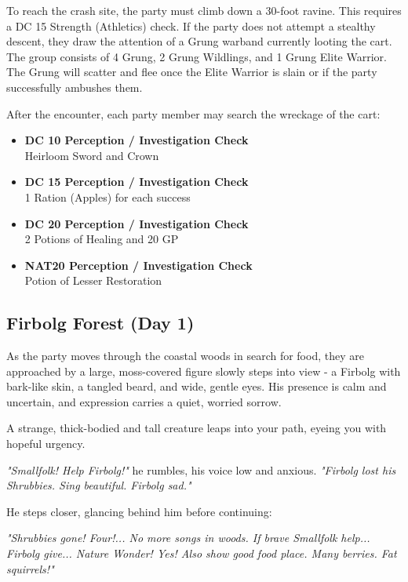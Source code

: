 {\noindent\entryfont To reach the crash site, the party must climb down a 30-foot ravine. This requires a DC 15 Strength (Athletics) check. If the party does not attempt a stealthy descent, they draw the attention of a Grung warband currently looting the cart. The group consists of 4 Grung, 2 Grung Wildlings, and 1 Grung Elite Warrior. The Grung will scatter and flee once the Elite Warrior is slain or if the party successfully ambushes them.

After the encounter, each party member may search the wreckage of the cart:
\begin{itemize}
	\renewcommand\labelitemi{\textbf{\textbullet}}
	\item \textbf{DC 10 Perception / Investigation Check}\\Heirloom Sword and Crown
	\item \textbf{DC 15 Perception / Investigation Check}\\1 Ration (Apples) for each success
	\item \textbf{DC 20 Perception / Investigation Check}\\2 Potions of Healing and 20 GP
	\item \textbf{NAT20 Perception / Investigation Check}\\Potion of Lesser Restoration
\end{itemize}}

\subsection*{Firbolg Forest (Day 1)}
{\entryfont As the party moves through the coastal woods in search for food, they are approached by a large, moss-covered figure slowly steps into view - a Firbolg with bark-like skin, a tangled beard, and wide, gentle eyes. His presence is calm and uncertain, and expression carries a quiet, worried sorrow.}

\begin{DndReadAloud}
	A strange, thick-bodied and tall creature leaps into your path, eyeing you with hopeful urgency.

	\textit{"Smallfolk! Help Firbolg!"} he rumbles, his voice low and anxious. \textit{"Firbolg lost his Shrubbies. Sing beautiful. Firbolg sad."}

	He steps closer, glancing behind him before continuing:

	\textit{"Shrubbies gone! Four!... No more songs in woods. If brave Smallfolk help... Firbolg give... Nature Wonder! Yes! Also show good food place. Many berries. Fat squirrels!"}
\end{DndReadAloud}

